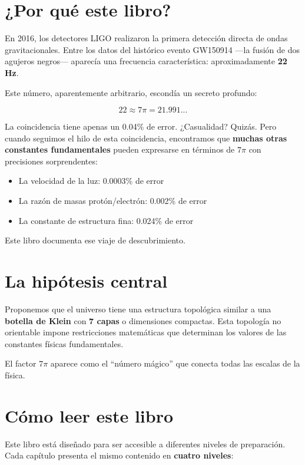 \documentclass[12pt,a4paper,openany]{book}
\begin{document}
\section*{¿Por qué este libro?}

En 2016, los detectores LIGO realizaron la primera detección directa de ondas gravitacionales. Entre los datos del histórico evento GW150914 ---la fusión de dos agujeros negros--- aparecía una frecuencia característica: aproximadamente \textbf{22 Hz}.

Este número, aparentemente arbitrario, escondía un secreto profundo:

\begin{equation}
    \boxed{22 \approx 7\pi = 21.991...}
\end{equation}

La coincidencia tiene apenas un 0.04\% de error. ¿Casualidad? Quizás. Pero cuando seguimos el hilo de esta coincidencia, encontramos que \textbf{muchas otras constantes fundamentales} pueden expresarse en términos de $7\pi$ con precisiones sorprendentes:

\begin{itemize}
    \item La velocidad de la luz: 0.0003\% de error
    \item La razón de masas protón/electrón: 0.002\% de error
    \item La constante de estructura fina: 0.024\% de error
\end{itemize}

Este libro documenta ese viaje de descubrimiento.

\section*{La hipótesis central}

Proponemos que el universo tiene una estructura topológica similar a una \textbf{botella de Klein} con \textbf{7 capas} o dimensiones compactas. Esta topología no orientable impone restricciones matemáticas que determinan los valores de las constantes físicas fundamentales.

El factor $7\pi$ aparece como el ``número mágico'' que conecta todas las escalas de la física.

\section*{Cómo leer este libro}

Este libro está diseñado para ser accesible a diferentes niveles de preparación. Cada capítulo presenta el mismo contenido en \textbf{cuatro niveles}:
\end{document}
